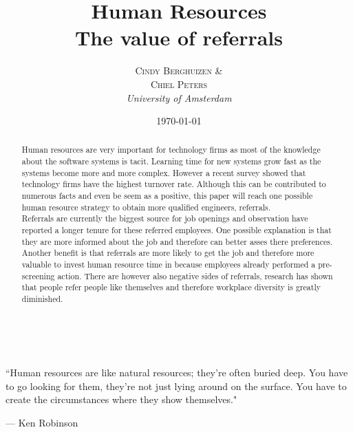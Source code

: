 \documentclass[a4paper, 11pt]{article} %
\title{\textbf{Human Resources}\\ %
The value of referrals} %
\author{\textsc{Cindy Berghuizen \& \\ Chiel Peters} %
\\{\textit{University of Amsterdam}}} %
\date{\today} %
\makeatletter
\renewcommand{\maketitle}{ %
\begin{flushright} %
{\LARGE\@title} %

\vspace{50pt} %

{\large\@author} %
\\\@date %

\vspace{20pt} %
\end{flushright}
}
\makeatother
\begin{document}
\maketitle %



\epigraph{``Human resources are like natural resources; they're often buried deep. You have to go looking for them, they're not just lying around on the surface. You have to create the circumstances where they show themselves."}{--- \textup{Ken Robinson}}

\begin{abstract}
Human resources are very important for technology firms as most of the knowledge about the software systems is tacit. Learning time for new systems grow fast as the systems become more and more complex. However a recent survey showed that technology firms have the highest turnover rate\cite{turnover}. Although this can be contributed to numerous facts and even be seem as a positive, this paper will reach one possible human resource strategy to obtain more qualified engineers, referrals. \\

Referrals are currently the biggest source for job openings \cite{referralpercentage} and observation have reported a longer tenure for these referred employees. One possible explanation is that they are more informed about the job and therefore can better asses there preferences. Another benefit is that referrals are more likely to get the job and therefore more valuable to invest human resource time in because employees already performed a pre-screening action. There are however also negative sides of referrals, research has shown that people refer people like themselves \cite{second} and therefore workplace diversity is greatly diminished.
\end{abstract}


\vspace{30pt} %

\end{document}
